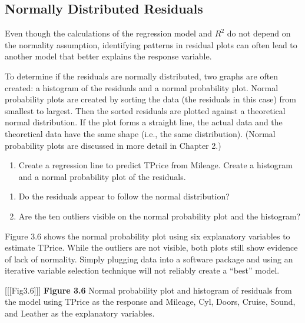 \documentclass[
]{report}
\providecommand{\tightlist}{%
  \setlength{\itemsep}{0pt}\setlength{\parskip}{0pt}}
\theoremstyle{definition}
\theoremstyle{definition}
\theoremstyle{definition}
\theoremstyle{definition}
\theoremstyle{remark}
\begin{document}
\hypertarget{normally-distributed-residuals}{%
\subsection*{Normally Distributed Residuals}\label{normally-distributed-residuals}}

Even though the calculations of the regression model and \(R^2\) do not depend on the normality assumption, identifying patterns in residual plots can often lead to another model that better explains the response variable.

To determine if the residuals are normally distributed, two graphs are often created: a histogram of the residuals and a normal probability plot. Normal probability plots are created by sorting the data (the residuals in this case) from smallest to largest. Then the sorted residuals are plotted against a theoretical normal distribution. If the plot forms a straight line, the actual data and the theoretical data have the same shape (i.e., the same distribution). (Normal probability plots are discussed in more detail in
Chapter 2.)

\begin{enumerate}
\def\labelenumi{\arabic{enumi}.}
\setcounter{enumi}{12}
\tightlist
\item
  Create a regression line to predict TPrice from Mileage. Create a histogram and a normal probability plot of the residuals.
\end{enumerate}

\begin{enumerate}
\def\labelenumi{\alph{enumi}.}
\item
  Do the residuals appear to follow the normal distribution?
\item
  Are the ten outliers visible on the normal probability plot and the histogram?
\end{enumerate}

Figure 3.6 shows the normal probability plot using six explanatory variables to estimate TPrice. While the outliers are not visible, both plots still show evidence of lack of normality. Simply plugging data into a software package and using an iterative variable selection technique will not reliably create a ``best'' model.

{[}{[}{[}Fig3.6{]}{]}{]}
\textbf{Figure 3.6} Normal probability plot and histogram of residuals from the model using TPrice as the response and Mileage, Cyl, Doors, Cruise, Sound, and Leather as the explanatory variables.
\end{document}

